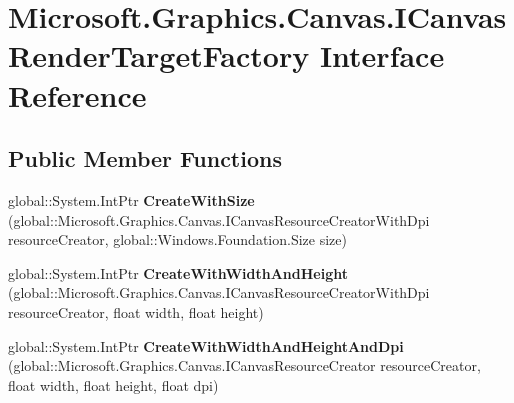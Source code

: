 \hypertarget{interface_microsoft_1_1_graphics_1_1_canvas_1_1_i_canvas_render_target_factory}{}\section{Microsoft.\+Graphics.\+Canvas.\+I\+Canvas\+Render\+Target\+Factory Interface Reference}
\label{interface_microsoft_1_1_graphics_1_1_canvas_1_1_i_canvas_render_target_factory}
\subsection*{Public Member Functions}
\begin{DoxyCompactItemize}
\item 
\mbox{\label{interface_microsoft_1_1_graphics_1_1_canvas_1_1_i_canvas_render_target_factory_ac73767c2259e7be23e5908d0eb7862f9}} 
global\+::\+System.\+Int\+Ptr {\bfseries Create\+With\+Size} (global\+::\+Microsoft.\+Graphics.\+Canvas.\+I\+Canvas\+Resource\+Creator\+With\+Dpi resource\+Creator, global\+::\+Windows.\+Foundation.\+Size size)
\item 
\mbox{\label{interface_microsoft_1_1_graphics_1_1_canvas_1_1_i_canvas_render_target_factory_afd51138794b4d13559098c29d90fa247}} 
global\+::\+System.\+Int\+Ptr {\bfseries Create\+With\+Width\+And\+Height} (global\+::\+Microsoft.\+Graphics.\+Canvas.\+I\+Canvas\+Resource\+Creator\+With\+Dpi resource\+Creator, float width, float height)
\item 
\mbox{\label{interface_microsoft_1_1_graphics_1_1_canvas_1_1_i_canvas_render_target_factory_a4955cd48960b91634ca9ebaf71914d35}} 
global\+::\+System.\+Int\+Ptr {\bfseries Create\+With\+Width\+And\+Height\+And\+Dpi} (global\+::\+Microsoft.\+Graphics.\+Canvas.\+I\+Canvas\+Resource\+Creator resource\+Creator, float width, float height, float dpi)
\item 
\mbox{\label{interface_microsoft_1_1_graphics_1_1_canvas_1_1_i_canvas_render_target_factory_a25958fedb26248394e6b8cfbc8e3de9f}} 

\end{DoxyCompactItemize}
